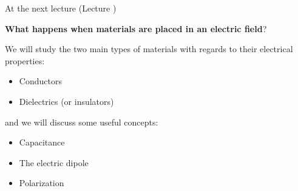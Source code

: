 

%
%

\renewcommand{\lecturesummarytitle}{Main points to remember }


%
%

\begin{frame}{At the next lecture (Lecture \nextlecture)}

{\bf What happens when materials are placed in an electric field}?\\

\vspace{0.2cm}

We will study the two main types of materials with regards to their electrical properties:
\begin{itemize}
  \item Conductors
  \item Dielectrics (or insulators)
\end{itemize}

\vspace{0.2cm}
and we will discuss some useful concepts:

\begin{itemize}
  \item Capacitance
  \item The electric dipole
  \item Polarization
\end{itemize}

\end{frame}

%
%



